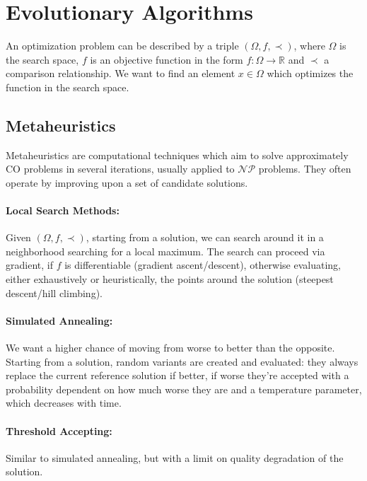 \section{Evolutionary Algorithms}

An optimization problem can be described by a triple $(\Omega, f, \prec)$, where $\Omega$ is the search space, $f$ is an objective function in the form $f: \Omega \rightarrow \mathbb{R}$ and $\prec$ a comparison relationship. We want to find an element $x \in \Omega$ which optimizes the function in the search space.\\

\subsection{Metaheuristics}
Metaheuristics are computational techniques which aim to solve approximately CO problems in several iterations, usually applied to $\mathcal{NP}$ problems. They often operate by improving upon a set of candidate solutions.\\
 
 \paragraph{Local Search Methods:} Given $(\Omega, f, \prec)$, starting from a solution, we can search around it in a neighborhood searching for a local maximum. The search can proceed via gradient, if $f$ is differentiable (gradient ascent/descent), otherwise evaluating, either exhaustively or heuristically, the points around the solution (steepest descent/hill climbing).\\
 
 \paragraph{Simulated Annealing:} We want a higher chance of moving from worse to better than the opposite. Starting from a solution, random variants are created and evaluated: they always replace the current reference solution if better, if worse they're accepted with a probability dependent on how much worse they are and a temperature parameter, which decreases with time.
 
 \paragraph{Threshold Accepting:} Similar to simulated annealing, but with a limit on quality degradation of the solution.
 
